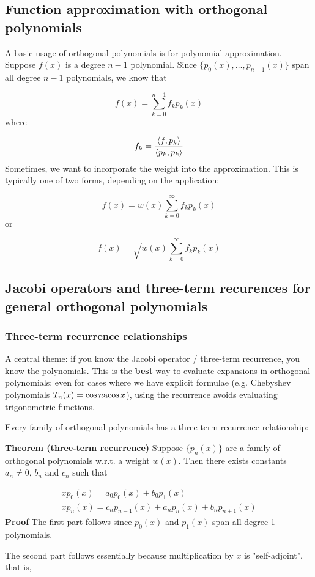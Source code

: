 \documentclass[12pt,a4paper]{article}
\def\acos{ {\rm acos}\, }
\def\ip<#1>{\left\langle{#1}\right\rangle}
\begin{document}
\subsection{Function approximation with orthogonal polynomials}
A basic usage of orthogonal polynomials is for polynomial approximation.  Suppose $f(x)$ is a degree $n-1$ polynomial. Since $\{p_0(x),\ldots,p_{n-1}(x)\}$ span all degree $n-1$ polynomials, we know that

\[
f(x) = \sum_{k=0}^{n-1} f_k p_k(x)
\]
where

\[
f_k = {\ip<f, p_k> \over \ip<p_k,p_k>}
\]
Sometimes, we want to incorporate the weight into the approximation. This is typically one of two forms, depending on the application: 

\[
f(x) = w(x) \sum_{k=0}^\infty f_k p_k(x)
\]
or

\[
        f(x) = \sqrt{w(x)} \sum_{k=0}^\infty f_k p_k(x)
\]
\subsection{Jacobi operators and three-term recurences for general orthogonal polynomials}
\subsubsection{Three-term recurrence relationships}
A central theme: if you know the Jacobi operator / three-term recurrence, you know the polynomials.  This is the \textbf{best} way to evaluate expansions in orthogonal polynomials: even for cases where we have explicit formulae (e.g. Chebyshev polynomials $T_n(x) = \cos n \acos x$),  using the recurrence avoids evaluating trigonometric functions.

Every family of orthogonal polynomials has a three-term recurrence relationship:

\textbf{Theorem (three-term recurrence)} Suppose $\{p_n(x)\}$ are a family of orthogonal polynomials w.r.t. a weight $w(x)$.  Then there exists constants $a_n \neq 0$, $b_n$ and $c_n$ such that


\begin{align*}
x p_0(x) = a_0 p_0(x) + b_0 p_1(x) \\
x p_n(x) = c_n p_{n-1}(x) + a_n p_n(x) + b_n p_{n+1}(x)
\end{align*}
\textbf{Proof} The first part follows since $p_0(x)$ and $p_1(x)$ span all degree 1 polynomials.

The second part follows essentially because multiplication by $x$ is "self-adjoint", that is,
\end{document}
